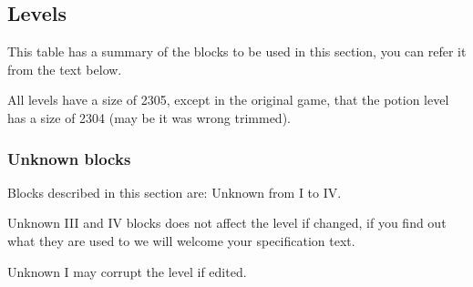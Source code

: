 \documentclass{article}
\begin{document}
\subsection{Levels \label{level blocks}}
 This table has a summary of the blocks to be used in this section,
 you can refer it from the text below.

\pagebreak[3]
\pagebreak[3]

 All levels have a size of 2305, except in the original game, that the
 potion level has a size of 2304 (may be it was wrong trimmed).

\subsubsection{Unknown blocks} %
 Blocks described in this section are: Unknown from I to IV.

 Unknown III and IV blocks does not affect the level if changed, if you
 find out what they are used to we will welcome your specification text.

 Unknown I may corrupt the level if edited.
\end{document}
